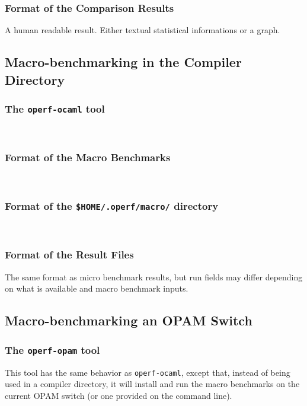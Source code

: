 \documentclass[11pt,a4paper]{article}
\begin{document}
\subsubsection{Format of the Comparison Results}

A human readable result. Either textual statistical informations or a graph.
~\vspace{4cm}~
\subsection{Macro-benchmarking in the Compiler Directory}

\subsubsection{The {\tt operf-ocaml} tool}
~\vspace{4cm}~

\subsubsection{Format of the Macro Benchmarks}
~\vspace{4cm}~

\subsubsection{Format of the {\tt \$HOME/.operf/macro/} directory}
~\vspace{4cm}~

\subsubsection{Format of the Result Files}

The same format as micro benchmark results, but run fields may differ
depending on what is available and macro benchmark inputs.
~\vspace{4cm}~

\subsection{Macro-benchmarking an OPAM Switch}

\subsubsection{The {\tt operf-opam} tool}

This tool has the same behavior as {\tt operf-ocaml}, except that,
instead of being used in a compiler directory, it will install and run
the macro benchmarks on the current OPAM switch (or one provided on
the command line).
\end{document}
